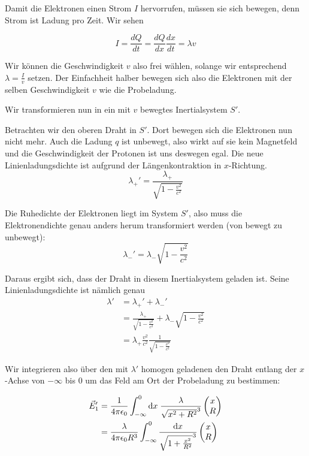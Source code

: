 \documentclass[a4paper,german,12pt,smallheadings]{scrartcl}
\begin{document}
Damit die Elektronen einen Strom $I$ hervorrufen, müssen sie sich bewegen, denn
Strom ist Ladung pro Zeit. Wir sehen

\begin{equation}
  I = \frac{dQ}{dt} = \frac{dQ}{dx} \frac{dx}{dt} = \lambda v
\end{equation}

Wir können die Geschwindigkeit $v$ also frei wählen, solange wir entsprechend
$\lambda = \frac{I}{v}$ setzen. Der Einfachheit halber bewegen sich also die
Elektronen mit der selben Geschwindigkeit $v$ wie die Probeladung.

Wir transformieren nun in ein mit $v$ bewegtes Inertialsystem $S'$.

Betrachten wir den oberen Draht in $S'$. Dort bewegen sich die Elektronen nun
nicht mehr. Auch die Ladung $q$ ist unbewegt, also wirkt auf sie kein
Magnetfeld und die Geschwindigkeit der Protonen ist uns deswegen egal. Die neue
Linienladungsdichte ist aufgrund der Längenkontraktion in $x$-Richtung.
\begin{equation}
  \lambda_+' = \frac{\lambda_+}{\sqrt{1 - \frac{v^2}{c^2}}}
\end{equation}

Die Ruhedichte der Elektronen liegt im System $S'$, also muss die
Elektronendichte genau anders herum transformiert werden (von bewegt zu
unbewegt):
\begin{equation}
  \lambda_-' = \lambda_- \sqrt{1 - \frac{v^2}{c^2}}
\end{equation}

Daraus ergibt sich, dass der Draht in diesem Inertialsystem geladen ist. Seine
Linienladungsdichte ist nämlich genau
\begin{align*}
  \lambda' &= \lambda_+' + \lambda_-' \\
       &= \frac{\lambda_+}{\sqrt{1 - \frac{v^2}{c^2}}} + \lambda_- \sqrt{1 - \frac{v^2}{c^2}} \\
       &= \lambda_{+} \frac{v^2}{c^2} \frac{1}{\sqrt{1-\frac{v^2}{c^2}}}
\end{align*}

Wir integrieren also über den mit $\lambda'$ homogen geladenen den Draht
entlang der $x$-Achse von $-\infty$ bis $0$ um das Feld am Ort der Probeladung
zu bestimmen:

\begin{align*}
  \vec{E}'_1 &= \frac{1}{4 \pi \epsilon_0} \int_{-\infty}^0 \dif x \;
  \frac{\lambda}{\sqrt{x^2 + R^2}^3} \begin{pmatrix} x \\ R \end{pmatrix} \\
  &= \frac{\lambda}{4 \pi \epsilon_0 R^3} \int_{-\infty}^0
  \frac{\dif x}{\sqrt{1 + \frac{x^2}{R^2}}^3} \begin{pmatrix} x \\ R \end{pmatrix}
\end{align*}
\end{document}
